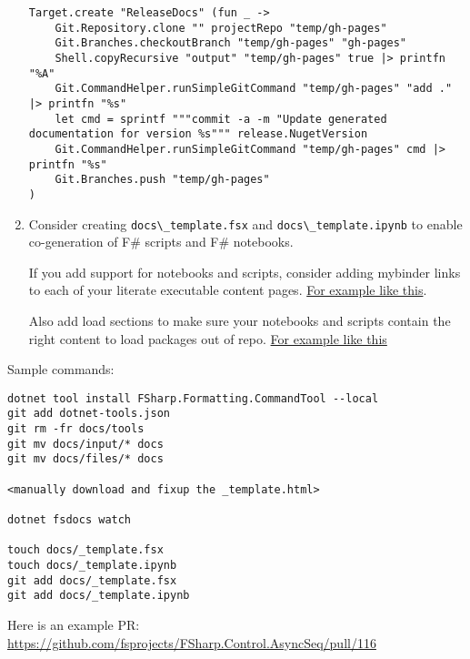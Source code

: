 \documentclass{article}
\begin{document}
\begin{enumerate}
\begin{lstlisting}
Target.create "ReleaseDocs" (fun _ ->
    Git.Repository.clone "" projectRepo "temp/gh-pages"
    Git.Branches.checkoutBranch "temp/gh-pages" "gh-pages"
    Shell.copyRecursive "output" "temp/gh-pages" true |> printfn "%A"
    Git.CommandHelper.runSimpleGitCommand "temp/gh-pages" "add ." |> printfn "%s"
    let cmd = sprintf """commit -a -m "Update generated documentation for version %s""" release.NugetVersion
    Git.CommandHelper.runSimpleGitCommand "temp/gh-pages" cmd |> printfn "%s"
    Git.Branches.push "temp/gh-pages"
)

\end{lstlisting}

\item 

Consider creating \texttt{docs{\textbackslash}\_template.fsx} and \texttt{docs{\textbackslash}\_template.ipynb} to enable co-generation of F\# scripts and F\# notebooks.


If you add support for notebooks and scripts, consider adding mybinder links to each of your literate executable content pages. \href{https://github.com/fsprojects/FSharp.Formatting/blob/master/docs/literate.fsx\#L19}{For example like this}.


Also add load sections to make sure your notebooks and scripts contain the right content to load packages out of repo.  \href{https://github.com/fsprojects/FSharp.Formatting/blob/master/docs/literate.fsx\#L1}{For example like this}

\end{enumerate}



Sample commands:
\begin{lstlisting}
dotnet tool install FSharp.Formatting.CommandTool --local
git add dotnet-tools.json   
git rm -fr docs/tools
git mv docs/input/* docs
git mv docs/files/* docs

<manually download and fixup the _template.html>

dotnet fsdocs watch

touch docs/_template.fsx
touch docs/_template.ipynb
git add docs/_template.fsx
git add docs/_template.ipynb

\end{lstlisting}


Here is an example PR: \href{https://github.com/fsprojects/FSharp.Control.AsyncSeq/pull/116}{https://github.com/fsprojects/FSharp.Control.AsyncSeq/pull/116}
\end{document}
